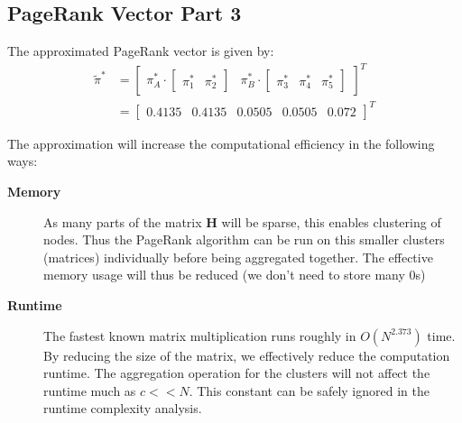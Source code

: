 \documentclass[]{article}
\begin{document}
\subsection{PageRank Vector Part 3}

The approximated PageRank vector is given by:
\begin{align*}
	\tilde{\pi}^* &= \begin{bmatrix}
		\pi^*_A \cdot \begin{bmatrix}
			\pi_1^* & \pi_2^*
		\end{bmatrix}
		&
		\pi^*_B \cdot \begin{bmatrix}
			\pi_3^* & \pi_4^* & \pi_5^*
		\end{bmatrix} 
	\end{bmatrix}^T 
	\\
	&= \begin{bmatrix}
	0.4135 & 0.4135 & 0.0505 & 0.0505 & 0.072
	\end{bmatrix}^T 
\end{align*}

The approximation will increase the computational efficiency in the following ways:
\begin{description}
	\item[\textbf{Memory}] As many parts of the matrix $\mathbf{H}$ will be sparse, this enables clustering of nodes.
	Thus the PageRank algorithm can be run on this smaller clusters (matrices) individually before being aggregated together. The effective memory usage will thus be reduced (we don't need to store many 0s)
	\item[\textbf{Runtime}] The fastest known matrix multiplication runs roughly in $O(N^{2.373})$ time. By reducing the size of the matrix, we effectively reduce the computation runtime. The aggregation operation for the clusters will not affect the runtime much as $c << N$. This constant can be safely ignored in the runtime complexity analysis.
\end{description}
\end{document}
